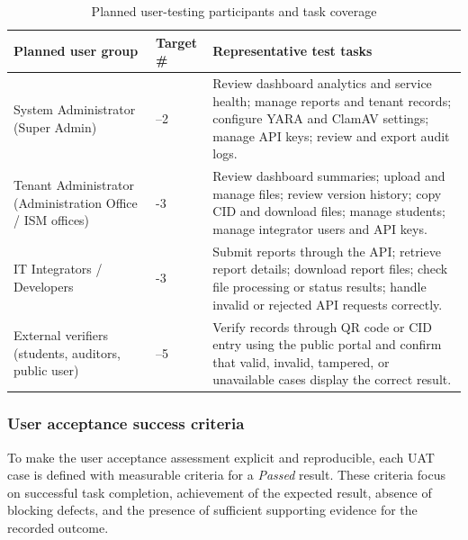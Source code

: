\begin{table}[htbp]
  \centering
  \smalltable
  \footnotesize
  {%
  \setlength{\tabcolsep}{8pt}
  \renewcommand{\arraystretch}{1.3}
  \begin{tabular}{|>{\raggedright\arraybackslash}p{3.3cm}|
                  >{\centering\arraybackslash}p{2.0cm}|
                  >{\raggedright\arraybackslash}p{6.6cm}|}
    \hline
    \textbf{Planned user group} &
    \textbf{Target \#} &
    \textbf{Representative test tasks} \\
    \hline\hline

    System Administrator (Super Admin) &
    1--2 &
    Review dashboard analytics and service health; manage reports and tenant
    records; configure YARA and ClamAV settings; manage API keys; review and
    export audit logs. \\
    \hline

    Tenant Administrator (Administration Office / ISM offices) &
    2-3 &
    Review dashboard summaries; upload and manage files; review version
    history; copy CID and download files; manage students; manage integrator
    users and API keys. \\
    \hline

    IT Integrators / Developers &
    2-3 &
    Submit reports through the API; retrieve report details; download report
    files; check file processing or status results; handle invalid or rejected
    API requests correctly. \\
    \hline

    External verifiers (students, auditors, public user) &
    4--5 &
    Verify records through QR code or CID entry using the public portal and
    confirm that valid, invalid, tampered, or unavailable cases display the
    correct result. \\
    \hline
  \end{tabular}
  }%
  \captionsetup{type=table}
  \caption{Planned user-testing participants and task coverage}
  \label{table:user-testing-plan}
\end{table}

\subsubsection{User acceptance success criteria}

To make the user acceptance assessment explicit and reproducible, each UAT
case is defined with measurable criteria for a \textit{Passed} result. These
criteria focus on successful task completion, achievement of the expected
result, absence of blocking defects, and the presence of sufficient
supporting evidence for the recorded outcome.

